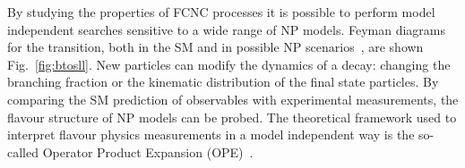 By studying the properties of FCNC processes it is possible to perform model independent searches sensitive to a wide range of NP models. Feyman diagrams for the \btosll transition, both in the SM and in possible NP scenarios~\cite{Gauld:2013qja,Altmannshofer:2014cfa,Crivellin:2015mga}, are shown Fig.~\ref{fig:btosll}. New particles can modify the dynamics of a decay: changing the branching fraction or the kinematic distribution of the final state particles. By comparing the SM prediction of observables with experimental measurements, the flavour structure of NP models can be probed. The theoretical framework used to interpret flavour physics measurements in a model independent way is the so-called Operator Product Expansion (OPE)~\cite{ope}.

\begin{figure}[!tb]
\centering
\begin{subfigure}{0.49\textwidth}
\caption{}
\label{fig:btosll:a}
\end{subfigure}
\begin{subfigure}{0.49\textwidth}
\begin{tikzpicture}

\end{tikzpicture}
\end{subfigure}
\end{figure}
